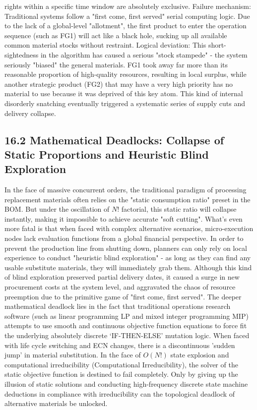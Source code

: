 \documentclass[11pt,a4paper]{article}
\begin{document}
rights within a specific time window are absolutely exclusive. Failure mechanism: Traditional systems follow a "first come, first served" serial computing logic. Due to the lack of a global-level "allotment", the first product to enter the operation sequence (such as FG1) will act like a black hole, sucking up all available common material stocks without restraint. Logical deviation: This short-sightedness in the algorithm has caused a serious "stock stampede" - the system seriously "biased" the general materials. FG1 took away far more than its reasonable proportion of high-quality resources, resulting in local surplus, while another strategic product (FG2) that may have a very high priority has no material to use because it was deprived of this key atom. This kind of internal disorderly snatching eventually triggered a systematic series of supply cuts and delivery collapse.


\subsection*{16.2 Mathematical Deadlocks: Collapse of Static Proportions and Heuristic Blind Exploration}


In the face of massive concurrent orders, the traditional paradigm of processing replacement materials often relies on the "static consumption ratio" preset in the BOM. But under the oscillation of $N!$ factorial, this static ratio will collapse instantly, making it impossible to achieve accurate "soft cutting". What's even more fatal is that when faced with complex alternative scenarios, micro-execution nodes lack evaluation functions from a global financial perspective. In order to prevent the production line from shutting down, planners can only rely on local experience to conduct "heuristic blind exploration" - as long as they can find any usable substitute materials, they will immediately grab them. Although this kind of blind exploration preserved partial delivery dates, it caused a surge in new procurement costs at the system level, and aggravated the chaos of resource preemption due to the primitive game of "first come, first served". The deeper mathematical deadlock lies in the fact that traditional operations research software (such as linear programming LP and mixed integer programming MIP) attempts to use smooth and continuous objective function equations to force fit the underlying absolutely discrete ‘IF-THEN-ELSE’ mutation logic. When faced with life cycle switching and ECN changes, there is a discontinuous 'sudden jump' in material substitution. In the face of $O(N!)$ state explosion and computational irreducibility (Computational Irreducibility), the solver of the static objective function is destined to fail completely. Only by giving up the illusion of static solutions and conducting high-frequency discrete state machine deductions in compliance with irreducibility can the topological deadlock of alternative materials be unlocked.
\end{document}
